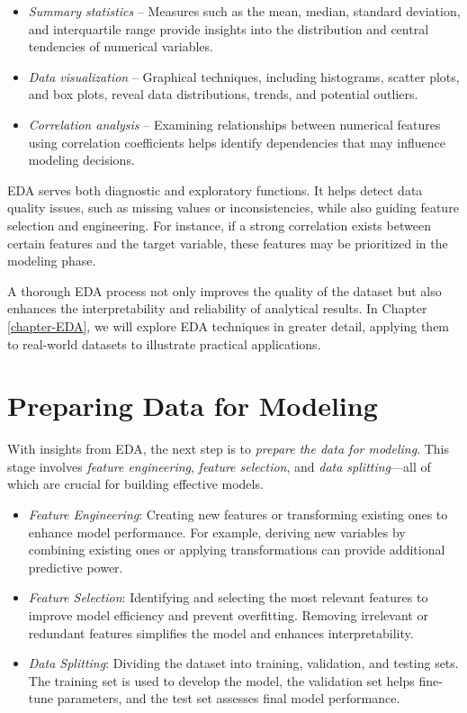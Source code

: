 \documentclass[
]{book}
\providecommand{\tightlist}{%
  \setlength{\itemsep}{0pt}\setlength{\parskip}{0pt}}
\theoremstyle{definition}
\theoremstyle{definition}
\theoremstyle{definition}
\theoremstyle{definition}
\theoremstyle{remark}
\begin{document}
\begin{itemize}
\tightlist
\item
  \emph{Summary statistics} -- Measures such as the mean, median, standard deviation, and interquartile range provide insights into the distribution and central tendencies of numerical variables.\\
\item
  \emph{Data visualization} -- Graphical techniques, including histograms, scatter plots, and box plots, reveal data distributions, trends, and potential outliers.\\
\item
  \emph{Correlation analysis} -- Examining relationships between numerical features using correlation coefficients helps identify dependencies that may influence modeling decisions.
\end{itemize}

EDA serves both diagnostic and exploratory functions. It helps detect data quality issues, such as missing values or inconsistencies, while also guiding feature selection and engineering. For instance, if a strong correlation exists between certain features and the target variable, these features may be prioritized in the modeling phase.

A thorough EDA process not only improves the quality of the dataset but also enhances the interpretability and reliability of analytical results. In Chapter \ref{chapter-EDA}, we will explore EDA techniques in greater detail, applying them to real-world datasets to illustrate practical applications.

\section{Preparing Data for Modeling}\label{preparing-data-for-modeling}

With insights from EDA, the next step is to \emph{prepare the data for modeling}. This stage involves \emph{feature engineering}, \emph{feature selection}, and \emph{data splitting}---all of which are crucial for building effective models.

\begin{itemize}
\tightlist
\item
  \emph{Feature Engineering}: Creating new features or transforming existing ones to enhance model performance. For example, deriving new variables by combining existing ones or applying transformations can provide additional predictive power.\\
\item
  \emph{Feature Selection}: Identifying and selecting the most relevant features to improve model efficiency and prevent overfitting. Removing irrelevant or redundant features simplifies the model and enhances interpretability.\\
\item
  \emph{Data Splitting}: Dividing the dataset into training, validation, and testing sets. The training set is used to develop the model, the validation set helps fine-tune parameters, and the test set assesses final model performance.
\end{itemize}
\end{document}
